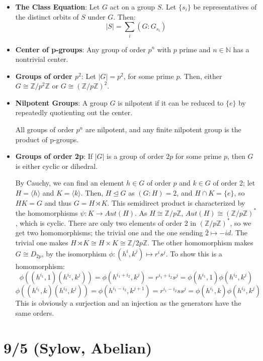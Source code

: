 \documentclass[11pt, oneside]{amsart}   	%
\theoremstyle{definition}
\begin{document}
\begin{itemize}
	\item \textbf{The Class Equation}: Let $G$ act on a group $S$. Let $\{s_i\}$ be representatives of the distinct orbits of $S$ under $G$. Then:
	$$
		|S| = \sum_i(G:G_{s_i})
	$$
	
	\item \textbf{Center of p-groups}: Any group of order $p^n$ with $p$ prime and $n\in\mathbb N$ has a nontrivial center.
	
	\item \textbf{Groups of order $p^2$}: Let $|G| = p^2$, for some prime $p$. Then, either $G\cong\mathbb Z/p^2\mathbb Z$ or 
	$G\cong(\mathbb Z/p\mathbb Z)^2$.
	
	\item \textbf{Nilpotent Groups}: A group $G$ is nilpotent if it can be reduced to $\{e\}$ by repeatedly quotienting out the center.
	
	All groups of order $p^n$ are nilpotent, and any finite nilpotent group is the product of p-groups.
	
	\item \textbf{Groups of order 2p}: If $|G|$ is a group of order $2p$ for some prime $p$, then $G$ is either cyclic or dihedral.
	
	By Cauchy, we can find an element $h\in G$ of order $p$ and $k\in G$ of order 2; let $H = \langle h\rangle$ and $K = \langle k\rangle$. Then, 
	$H\trianglelefteq G$ as $(G : H) = 2$, and $H\cap K = \{e\}$, so $HK = G$ and thus $G = H\rtimes K$. This semidirect product is characterized 
	by the homomorphisms $\psi : K\rightarrow Aut(H)$. As $H\cong \mathbb Z/p\mathbb Z$, $Aut(H) \cong (\mathbb Z / p\mathbb Z)^*$, which 
	is cyclic. There are only two elements of order 2 in $(\mathbb Z / p\mathbb Z)^*$, so we get two homomorphisms; the trivial one and the one 
	sending $\bar 2\mapsto -id$. The trivial one makes $H\rtimes K\cong H\times K\cong \mathbb Z/2p\mathbb Z$. The other homomorphism 
	makes $G\cong D_{2p}$, by the isomorphism $\phi: (h^i, k^j)\mapsto r^is^j$. To show this is a homomorphism:
	$$
		\phi((h^{i_1}, 1)(h^{i_2}, k^j)) = \phi(h^{i_1 + i_2}, k^j) = r^{i_1 + i_2}s^j = \phi(h^{i_1}, 1)\phi(h^{i_2}, k^j)
	$$
	$$
		\phi((h^{i_1}, k)(h^{i_2}, k^j)) = \phi(h^{i_1 - i_2}, k^{j + 1}) = r^{i_1 - i_2}ss^j = \phi(h^{i_1}, k)\phi(h^{i_2}, k^j)
	$$
	This is obviously a surjection and an injection as the generators have the same orders.

\end{itemize}

\section{9/5 (Sylow, Abelian)}
\end{document}
